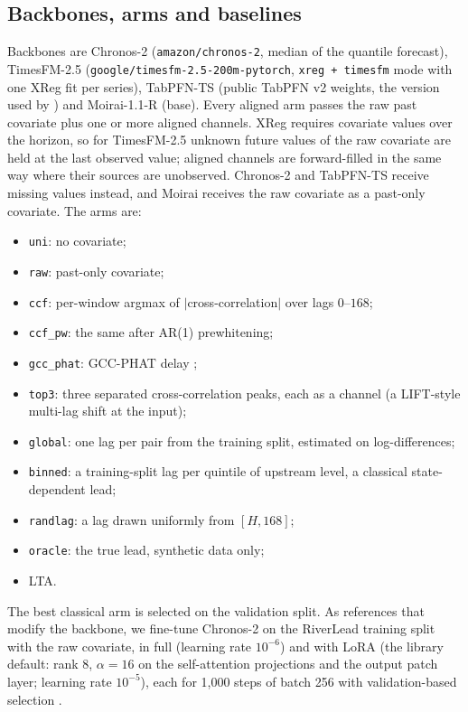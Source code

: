 \documentclass[preprint,11pt,authoryear]{elsarticle}
\newcommand{\lta}{\textsc{LTA}}
\begin{document}
\subsection{Backbones, arms and baselines}
\label{sec:arms}
Backbones are Chronos-2 (\texttt{amazon/chronos-2}, median of the quantile forecast), TimesFM-2.5 (\texttt{google/timesfm-2.5-200m-pytorch}, \texttt{xreg + timesfm} mode with one XReg fit per series), TabPFN-TS (public TabPFN v2 weights, the version used by \citealp{hoo2025tabpfnts}) and Moirai-1.1-R (base). Every aligned arm passes the raw past covariate plus one or more aligned channels. XReg requires covariate values over the horizon, so for TimesFM-2.5 unknown future values of the raw covariate are held at the last observed value; aligned channels are forward-filled in the same way where their sources are unobserved. Chronos-2 and TabPFN-TS receive missing values instead, and Moirai receives the raw covariate as a past-only covariate. The arms are:
\begin{itemize}
\item \texttt{uni}: no covariate;
\item \texttt{raw}: past-only covariate;
\item \texttt{ccf}: per-window argmax of $|$cross-correlation$|$ over lags $0$--$168$;
\item \texttt{ccf\_pw}: the same after AR(1) prewhitening;
\item \texttt{gcc\_phat}: GCC-PHAT delay \citep{knapp1976};
\item \texttt{top3}: three separated cross-correlation peaks, each as a channel (a LIFT-style multi-lag shift at the input);
\item \texttt{global}: one lag per pair from the training split, estimated on log-differences;
\item \texttt{binned}: a training-split lag per quintile of upstream level, a classical state-dependent lead;
\item \texttt{randlag}: a lag drawn uniformly from $[H,168]$;
\item \texttt{oracle}: the true lead, synthetic data only;
\item \lta{}.
\end{itemize}
The best classical arm is selected on the validation split. As references that modify the backbone, we fine-tune Chronos-2 on the RiverLead training split with the raw covariate, in full (learning rate $10^{-6}$) and with LoRA (the library default: rank 8, $\alpha=16$ on the self-attention projections and the output patch layer; learning rate $10^{-5}$), each for 1,000 steps of batch 256 with validation-based selection \citep{hu2022lora}.
\end{document}
